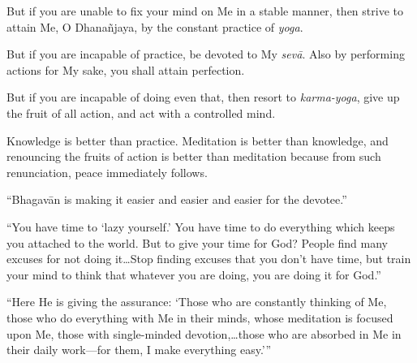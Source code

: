 {But if you are unable to fix your mind on Me in a stable manner, then strive to attain Me, O Dhanañjaya, by the constant practice of \textit{yoga}.}

{But if you are incapable of practice, be devoted to My \textit{sevā}. Also by performing actions for My sake, you shall attain perfection.}

{But if you are incapable of doing even that, then resort to \textit{karma-yoga}, give up the fruit of all action, and act with a controlled mind.}

{Knowledge is better than practice. Meditation is better than knowledge, and renouncing the fruits of action is better than meditation because from such renunciation, peace immediately follows.}

\enquote{Bhagavān is making it easier and easier and easier for the devotee.}

\enquote{You have time to \enquote{lazy yourself.} You have time to do everything which keeps you attached to the world. But to give your time for God? People find many excuses for not doing it\ldots Stop finding excuses that you don’t have time, but train your mind to think that whatever you are doing, you are doing it for God.}

\enquote{Here He is giving the assurance: \enquote{Those who are constantly thinking of Me, those who do everything with Me in their minds, whose meditation is focused upon Me, those with single-minded devotion,\ldots those who are absorbed in Me in their daily work---for them, I make everything easy.}}

